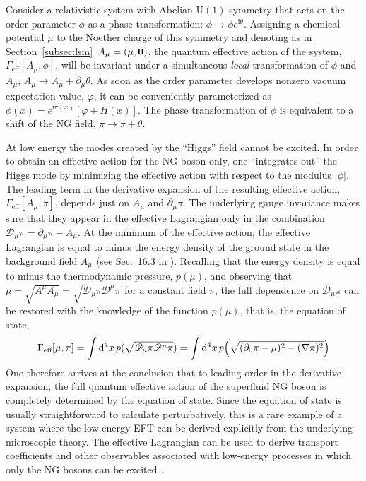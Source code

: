 \documentclass[final,2p,times,12pt,sort&compress]{elsarticle}
\newcommand\gr[1]{\mathrm{#1}}              %
\newcommand\DD{\mathscr{D}}                 %
\newcommand\vek[1]{{\boldsymbol{\bf #1}}}   %
\newcommand\imag{\mathrm i}                 %
\newcommand\de{\partial}
\newcommand\vp{\varphi}
\newcommand\vt{\theta}
\newcommand\abs[1]{\left|#1\right|}         %
\newcommand\dfour{\mathop{{\rm d}^4\!}\nolimits} %
\begin{document}
Consider a relativistic system with Abelian $\gr{U(1)}$ symmetry that acts on
the order parameter $\phi$ as a phase transformation: $\phi\to\phi
e^{\imag\vt}$. Assigning a chemical potential $\mu$ to the Noether charge of
this symmetry and denoting as in Section~\ref{subsec:lsm}\ $A_\mu=(\mu,\vek0)$,
the quantum effective action of the system, $\Gamma_{\text{eff}}[A_\mu,\phi]$,
will be invariant under a simultaneous \emph{local} transformation of $\phi$ and
$A_\mu$, $A_\mu\to A_\mu+\de_\mu\vt$. As soon as the order parameter develops
nonzero vacuum expectation value, $\vp$, it can be conveniently parameterized
as $\phi(x)=e^{\imag\pi(x)}[\vp+H(x)]$. The phase transformation of $\phi$ is
equivalent to a shift of the NG field, $\pi\to\pi+\vt$.

At low energy the modes created by the ``Higgs'' field cannot be excited. In
order to obtain an effective action for the NG boson only, one ``integrates
out'' the Higgs mode by minimizing the effective action with respect to the
modulus $\abs\phi$. The leading term in the derivative expansion of the
resulting effective action, $\Gamma_{\text{eff}}[A_\mu,\pi]$, depends just on
$A_\mu$ and $\de_\mu\pi$. The underlying gauge invariance makes sure that they
appear in the effective Lagrangian only in the combination
$\DD_\mu\pi=\de_\mu\pi-A_\mu$. At the minimum of the effective action, the
effective Lagrangian is equal to minus the energy density of the ground state
in the background field $A_\mu$ (see Sec.~16.3 in \cite{Weinberg:1996v2}).
Recalling that the energy density is equal to minus the thermodynamic pressure,
$p(\mu)$, and observing that $\mu=\sqrt{A^\mu
A_\mu}=\sqrt{\DD_\mu\pi\DD^\mu\pi}$ for a constant field $\pi$, the full
dependence on $\DD_\mu\pi$ can be restored with the knowledge of the function
$p(\mu)$, that is, the equation of state,
\begin{equation}
\Gamma_{\text{eff}}[\mu,\pi]=
\int\dfour x\,p(\sqrt{\DD_\mu\pi\DD^\mu\pi})=
\int\dfour x\,p\Bigl(\sqrt{(\de_0\pi-\mu)^2-(\nabla\pi)^2}\Bigr)
\end{equation}
One therefore arrives at the conclusion that to leading order in the derivative
expansion, the full quantum effective action of the superfluid NG boson is
completely determined by the equation of state. Since the equation of state is
usually straightforward to calculate perturbatively, this is a rare example of
a system where the low-energy EFT can be derived explicitly from the underlying
microscopic theory. The effective Lagrangian can be used to derive transport
coefficients and other observables associated with low-energy processes in
which only the NG bosons can be excited \cite{Manuel:2004iv}.
\end{document}
